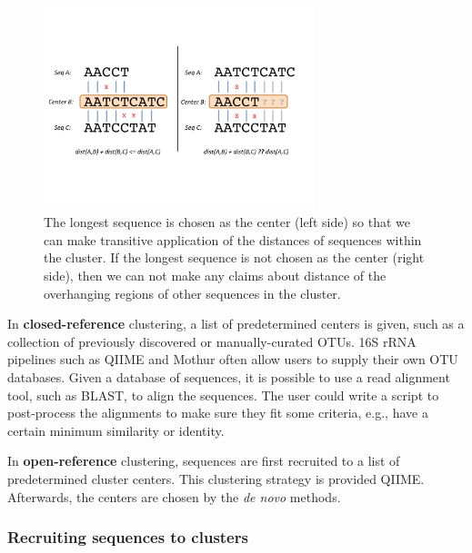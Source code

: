 

\begin{figure}[tb!]
  \centering
    \includegraphics[width=0.7\textwidth]{overlap}
  \caption{The longest sequence is chosen as the center (left side) so that we can make transitive application of the distances of sequences within the cluster.  If the longest sequence is not chosen as the center (right side), then we can not make any claims about distance of the overhanging regions of other sequences in the cluster.}
  \label{fig:overlap}
\end{figure}



In {\bf closed-reference} clustering, a list of predetermined centers is given, such as a collection of previously discovered or manually-curated OTUs\cite{desantis_greengenes_2006,quast_silva_2013}.
16S rRNA pipelines such as QIIME\cite{caporaso_qiime_2010} and Mothur\cite{schloss_introducing_2009} often allow users to supply their own OTU databases.
Given a database of sequences, it is possible to use a read alignment tool, such as BLAST\cite{altschul_gapped_1997}, to align the sequences.
The user could write a script to post-process the alignments to make sure they fit some criteria, e.g., have a certain minimum similarity or identity.

In {\bf open-reference} clustering, sequences are first recruited to a list of predetermined cluster centers.
This clustering strategy is provided QIIME.
Afterwards, the centers are chosen by the \emph{de novo} methods.

\subsubsection{Recruiting sequences to clusters}

